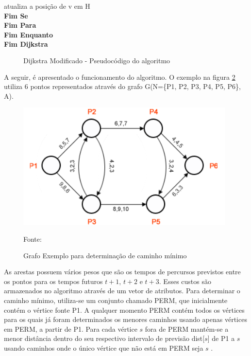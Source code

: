 {\begin{minipage}{70ex}
\vspace*{-1mm} \phantom{} \hspace{12ex} atualiza a posição de v em H\\
\vspace*{-1mm} \phantom{} \hspace{9ex} {\bf Fim Se}\\
\vspace*{-1mm} \phantom{} \hspace{6ex} {\bf Fim Para}\\
\vspace*{-1mm} \phantom{} \hspace{3ex} {\bf Fim Enquanto}\\
\vspace*{-1mm} \phantom{} \hspace{0ex} {\bf Fim Dijkstra}\\
\end{minipage}}
\begin{figure}[htbp]
\centering
\caption{Dijkstra Modificado - Pseudocódigo do algoritmo}
\label{fig:diMod}
\end{figure}
\FloatBarrier

A seguir, é apresentado o funcionamento do algoritmo. O exemplo na figura \ref{fig:leo1} utiliza
6 pontos representados através do grafo G(N=\{P1, P2, P3, P4, P5, P6\}, A).

\begin{figure}[htbp]
\centering
 \includegraphics[width=.55\textwidth]{chapters/fig/leo1.png}
\caption{Grafo Exemplo para determinação de caminho mínimo}
Fonte: \cite{leonard}
\label{fig:leo1}
\end{figure}

As arestas possuem vários pesos que são os tempos de percursos previstos entre os pontos para os tempos
futuros $t + 1$, $t + 2$ e $t + 3$. Esses custos são armazenados no algoritmo através de um vetor de atributos.
Para determinar o caminho mínimo, utiliza-se um conjunto chamado PERM, que inicialmente contém o vértice fonte P1.
A qualquer momento PERM contém todos os vértices para os quais já foram determinados os menores caminhos usando
apenas vértices em PERM, a partir de P1. Para cada vértice $s$ fora de PERM mantém-se a menor distância dentro do
seu respectivo intervalo de previsão dist[$s$] de P1 a $s$ usando caminhos onde o único vértice que não está em
PERM seja $s$ \cite{leonard}.

